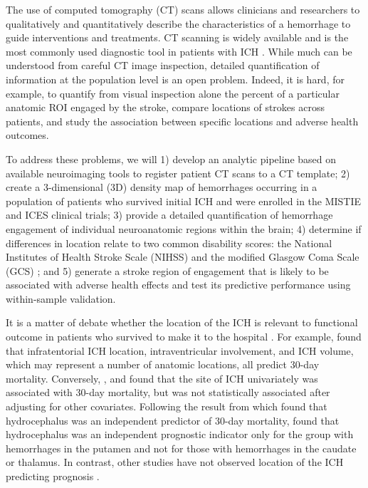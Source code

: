 \documentclass[10pt]{article}\usepackage[]{graphicx}\usepackage[]{color}
\begin{document}
The use of computed tomography (CT) scans allows clinicians and researchers to qualitatively and quantitatively describe the characteristics of a hemorrhage to guide interventions and treatments.  CT scanning is widely available and is the most commonly used diagnostic tool in patients with ICH \citep{sahni_management_2007}. While much can be understood from careful CT image inspection, detailed quantification of information at the population level is an open problem. Indeed, it is hard, for example, to quantify from visual inspection alone the percent of a particular anatomic ROI engaged by the stroke, compare locations of strokes across patients, and study the association between specific locations and adverse health outcomes.

To address these problems, we will 1) develop an analytic pipeline based on available neuroimaging tools to register patient CT scans to a CT template; 2) create a 3-dimensional (3D) density map of hemorrhages occurring in a population of patients who survived initial ICH and were enrolled in the MISTIE and ICES clinical trials; 3) provide a detailed quantification of hemorrhage engagement of individual neuroanatomic regions within the brain; 4) determine if differences in location relate to two common disability scores: the National Institutes of Health Stroke Scale (NIHSS) \citep{brott_measurements_1989} 
and the modified Glasgow Coma Scale (GCS) \citep{teasdale_assessment_1974, teasdale_assessment_1976}; 
and 5) generate a stroke region of engagement that is likely to be associated with adverse health effects and test its predictive performance using within-sample validation.

It is a matter of debate whether the location of the ICH is relevant to functional outcome in patients who survived to make it to the hospital \citep{carhuapoma_intracerebral_2009}. For example, \citet{hemphill_ich_2001} found that infratentorial ICH location, intraventricular involvement, and ICH volume, which may represent a number of anatomic locations, all predict 30-day mortality. Conversely, \citet{chuang_risk_2009}, and \citet{diringer_hydrocephalus:_1998} found that the site of ICH univariately was associated with 30-day mortality, but was not statistically associated after adjusting for other covariates.  Following the result from \citet{diringer_hydrocephalus:_1998} which found that hydrocephalus was an independent predictor of 30-day mortality, \citet{phan_hydrocephalus_2000} found that hydrocephalus was an independent prognostic indicator only for the group with hemorrhages in the putamen and not for those with hemorrhages in the caudate or thalamus. In contrast, other studies have not observed location of the ICH predicting prognosis \citep{portenoy_intracerebral_1987, senant_[multi-factorial_1988, daverat_death_1991, broderick_volume_1993, lisk_early_1994, mase_immediate_1995, qureshi_predictors_1995, razzaq_determinants_1998, hallevy_spontaneous_2002, cheung_use_2003}.  
\end{document}
